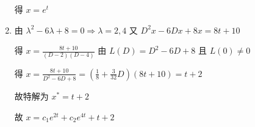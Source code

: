 \begin{enumerate}
                   得 \( x = e^{t} \)
             \item %
                   由 \( \lambda^{2} - 6\lambda + 8 = 0 \Rightarrow \lambda = 2, 4 \) 又 \( D^{2}x - 6Dx + 8x = 8t + 10 \)

                   得 \( x = \frac{8t+10}{(D-2)(D-4)} \) 由 \( L(D) = D^{2}-6D+8 \) 且 \( L(0) \neq 0 \)

                   得 \( x = \frac{8t+10}{D^{2}-6D+8} = \left( \frac{1}{8} + \frac{3}{32}D \right)(8t+10) = t + 2 \)

                   故特解为 \( x^{*} = t + 2 \)

                   故 \( x = c_{1}e^{2t} + c_{2}e^{4t} + t + 2 \)
         \end{enumerate}


     \paragraph{} %
